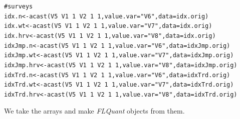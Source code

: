 \documentclass[a4paper,english,10pt]{article}\usepackage[]{graphicx}\usepackage[]{color}
\makeatletter
\newcommand{\hlnum}[1]{\textcolor[rgb]{0.2,0.2,0.2}{#1}}%
\newcommand{\hlstr}[1]{\textcolor[rgb]{0.2,0.2,0.2}{#1}}%
\newcommand{\hlcom}[1]{\textcolor[rgb]{0.2,0.267,0.4}{#1}}%
\newcommand{\hlopt}[1]{\textcolor[rgb]{0.2,0.2,0.2}{#1}}%
\newcommand{\hlstd}[1]{\textcolor[rgb]{0,0,0}{#1}}%
\newcommand{\hlkwb}[1]{\textcolor[rgb]{0.361,0.506,0.596}{#1}}%
\newcommand{\hlkwc}[1]{\textcolor[rgb]{0.361,0.506,0.596}{#1}}%
\newcommand{\hlkwd}[1]{\textcolor[rgb]{0.361,0.506,0.596}{#1}}%
\newenvironment{kframe}{%
 \def\at@end@of@kframe{}%
 \ifinner\ifhmode%
  \def\at@end@of@kframe{\end{minipage}}%
  \begin{minipage}{\columnwidth}%
 \fi\fi%
 \def\FrameCommand##1{\hskip\@totalleftmargin \hskip-\fboxsep
 \colorbox{shadecolor}{##1}\hskip-\fboxsep
     \hskip-\linewidth \hskip-\@totalleftmargin \hskip\columnwidth}%
 \MakeFramed {\advance\hsize-\width
   \@totalleftmargin\z@ \linewidth\hsize
   \@setminipage}}%
 {\par\unskip\endMakeFramed%
 \at@end@of@kframe}
\newenvironment{knitrout}{}{} %
\newcommand{\class}[1]{{\textit{#1}}}
\makeatother
\begin{document}
\begin{knitrout}
\begin{kframe}
\begin{alltt}
\hlcom{# surveys}
\hlstd{idx.n} \hlkwb{<-} \hlkwd{acast}\hlstd{(V5}\hlopt{~}\hlstd{V1}\hlopt{~}\hlnum{1}\hlopt{~}\hlstd{V2}\hlopt{~}\hlnum{1}\hlopt{~}\hlnum{1}\hlstd{,} \hlkwc{value.var}\hlstd{=}\hlstr{"V6"}\hlstd{,} \hlkwc{data}\hlstd{=idx.orig)}
\hlstd{idx.wt} \hlkwb{<-} \hlkwd{acast}\hlstd{(V5}\hlopt{~}\hlstd{V1}\hlopt{~}\hlnum{1}\hlopt{~}\hlstd{V2}\hlopt{~}\hlnum{1}\hlopt{~}\hlnum{1}\hlstd{,} \hlkwc{value.var}\hlstd{=}\hlstr{"V7"}\hlstd{,} \hlkwc{data}\hlstd{=idx.orig)}
\hlstd{idx.hrv} \hlkwb{<-} \hlkwd{acast}\hlstd{(V5}\hlopt{~}\hlstd{V1}\hlopt{~}\hlnum{1}\hlopt{~}\hlstd{V2}\hlopt{~}\hlnum{1}\hlopt{~}\hlnum{1}\hlstd{,} \hlkwc{value.var}\hlstd{=}\hlstr{"V8"}\hlstd{,} \hlkwc{data}\hlstd{=idx.orig)}
\hlstd{idxJmp.n} \hlkwb{<-} \hlkwd{acast}\hlstd{(V5}\hlopt{~}\hlstd{V1}\hlopt{~}\hlnum{1}\hlopt{~}\hlstd{V2}\hlopt{~}\hlnum{1}\hlopt{~}\hlnum{1}\hlstd{,} \hlkwc{value.var}\hlstd{=}\hlstr{"V6"}\hlstd{,} \hlkwc{data}\hlstd{=idxJmp.orig)}
\hlstd{idxJmp.wt} \hlkwb{<-} \hlkwd{acast}\hlstd{(V5}\hlopt{~}\hlstd{V1}\hlopt{~}\hlnum{1}\hlopt{~}\hlstd{V2}\hlopt{~}\hlnum{1}\hlopt{~}\hlnum{1}\hlstd{,} \hlkwc{value.var}\hlstd{=}\hlstr{"V7"}\hlstd{,} \hlkwc{data}\hlstd{=idxJmp.orig)}
\hlstd{idxJmp.hrv} \hlkwb{<-} \hlkwd{acast}\hlstd{(V5}\hlopt{~}\hlstd{V1}\hlopt{~}\hlnum{1}\hlopt{~}\hlstd{V2}\hlopt{~}\hlnum{1}\hlopt{~}\hlnum{1}\hlstd{,} \hlkwc{value.var}\hlstd{=}\hlstr{"V8"}\hlstd{,} \hlkwc{data}\hlstd{=idxJmp.orig)}
\hlstd{idxTrd.n} \hlkwb{<-} \hlkwd{acast}\hlstd{(V5}\hlopt{~}\hlstd{V1}\hlopt{~}\hlnum{1}\hlopt{~}\hlstd{V2}\hlopt{~}\hlnum{1}\hlopt{~}\hlnum{1}\hlstd{,} \hlkwc{value.var}\hlstd{=}\hlstr{"V6"}\hlstd{,} \hlkwc{data}\hlstd{=idxTrd.orig)}
\hlstd{idxTrd.wt} \hlkwb{<-} \hlkwd{acast}\hlstd{(V5}\hlopt{~}\hlstd{V1}\hlopt{~}\hlnum{1}\hlopt{~}\hlstd{V2}\hlopt{~}\hlnum{1}\hlopt{~}\hlnum{1}\hlstd{,} \hlkwc{value.var}\hlstd{=}\hlstr{"V7"}\hlstd{,} \hlkwc{data}\hlstd{=idxTrd.orig)}
\hlstd{idxTrd.hrv} \hlkwb{<-} \hlkwd{acast}\hlstd{(V5}\hlopt{~}\hlstd{V1}\hlopt{~}\hlnum{1}\hlopt{~}\hlstd{V2}\hlopt{~}\hlnum{1}\hlopt{~}\hlnum{1}\hlstd{,} \hlkwc{value.var}\hlstd{=}\hlstr{"V8"}\hlstd{,} \hlkwc{data}\hlstd{=idxTrd.orig)}
\end{alltt}
\end{kframe}
\end{knitrout}

We take the arrays and make \class{FLQuant} objects from them.
\end{document}
